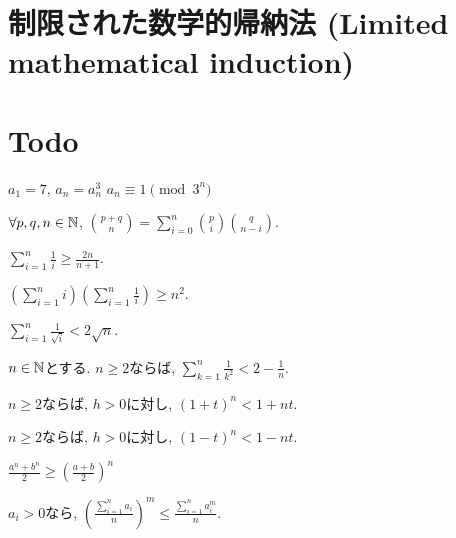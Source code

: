 \section{制限された数学的帰納法 (Limited mathematical induction)}

\section{Todo}








\begin{prop}
  $a_1=7$, $a_{n}=a_{n}^3$
  $a_n\equiv 1\pmod{3^n}$
\end{prop}


\begin{prop}
  $\forall p,q,n\in\mathbb{N}$,
  $\binom{p+q}{n}=\sum_{i=0}^n\binom{p}{i}\binom{q}{n-i}$.
\end{prop}



\begin{prop}
$\sum_{i=1}^{n}\frac{1}{i}\geq \frac{2n}{n+1}$.
\end{prop}

\begin{prop}
$\left(\sum_{i=1}^{n}i\right)\left(\sum_{i=1}^{n}\frac{1}{i}\right)\geq n^2$.
\end{prop}

\begin{prop}
$\sum_{i=1}^{n}\frac{1}{\sqrt{i}}<2\sqrt{n}$.
\end{prop}

\begin{prop}
$n\in\mathbb{N}$とする.
  $n\geq 2$ならば, $\sum_{k=1}^n\frac{1}{k^2} < 2-\frac{1}{n}$.
\end{prop}

\begin{prop}
  $n\geq 2$ならば,  $h>0$に対し,
$(1+t)^n<1+nt$.
\end{prop}
\begin{prop}
  $n\geq 2$ならば,  $h>0$に対し,
$(1-t)^n<1-nt$.
\end{prop}

\begin{prop}
$\frac{a^n+b^n}{2}\geq \left(\frac{a+b}{2}\right)^n$
\end{prop}

\begin{prop}
  $a_i>0$なら,
  $\left(\frac{\sum_{i=1}^n a_i}{n}\right)^m \leq \frac{\sum_{i=1}^{n}a_i^m}{n}$.
\end{prop}

